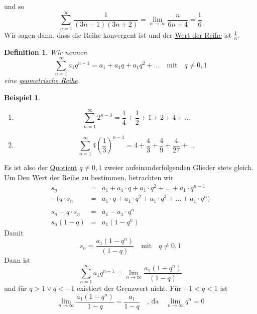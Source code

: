 \documentclass{report}
\newtheorem{mydef}{Definition}
\newtheorem{myexample}{Beispiel}
\begin{document}
und so
\begin{equation}\sum_{n=1}^{\infty} \frac{1}{(3n-1)(3n+2)} = \lim_{n \to \infty} \frac{n}{6n+4} = \frac{1}{6}\end{equation}
Wir sagen dann, dass die Reihe konvergent ist und der \underline{Wert der Reihe} ist $\frac{1}{6}$.
\begin{mydef}Wir nennen
\begin{equation}\sum_{n=1}^{\infty} a_1 q^{n-1} = a_1 + a_1 q + a_1 q^2 + ... \quad \mbox{mit} \quad q \neq 0,1\end{equation}
eine \underline{geometrische Reihe}.\end{mydef}
\begin{myexample}\begin{enumerate}
\item \begin{equation}\sum_{n=1}^{\infty} 2^{n-3} = \frac{1}{4} + \frac{1}{2} + 1 + 2 + 4 + ...\end{equation}
\item \begin{equation}\sum_{n=1}^{\infty} 4(\frac{1}{3})^{n-1} = 4 + \frac{4}{3} + \frac{4}{9} + \frac{4}{27} + ...\end{equation}
\end{enumerate}\end{myexample}
Es ist also der \underline{Quotient} $q \neq 0,1$ zweier aufeinanderfolgenden Glieder stets gleich. Um Den Wert der Reihe zu bestimmen, betrachten wir
\begin{eqnarray}s_n & = & a_1 + a_1 \cdot q + a_1 \cdot q^2 + ... + a_1 \cdot q^{n-1} \nonumber \\
- ( q \cdot s_n & = & a_1 \cdot q + a_1 \cdot q^2 + a_1 \cdot q^3 + ... + a_1 \cdot q^n ) \nonumber \\\\
s_n - q \cdot s_n & = & a_1 - a_1 \cdot q^n \nonumber \\
s_n (1-q) & = &  a_1(1-q^n)\end{eqnarray}
Damit
\begin{equation}s_n = \frac{a_1(1-q^n)}{(1-q)} \quad \mbox{mit} \quad q \neq 0,1\end{equation}
Dann ist
\begin{equation}\sum_{n=1}^{\infty} a_1 q^{n-1} = \lim_{n \to \infty} \frac{a_1(1-q^n)}{(1-q)}\end{equation}
und für $q > 1 \lor q < -1$ existiert der Grenzwert nicht. Für $-1 < q < 1$ ist
\begin{equation}\lim_{n \to \infty}\frac{a_1(1-q^n)}{1-q} = \frac{a_1}{1-q} \quad \mbox{, da} \quad \lim_{n \to \infty}q^n = 0\end{equation}
\end{document}
